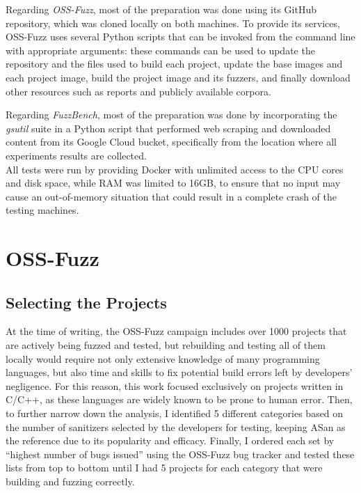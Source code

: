 Regarding \textit{OSS-Fuzz}, most of the preparation was done using its GitHub repository, which was cloned locally on both machines. To provide its services, OSS-Fuzz uses several Python scripts that can be invoked from the command line with appropriate arguments: these commands can be used to update the repository and the files used to build each project, update the base images and each project image, build the project image and its fuzzers, and finally download other resources such as reports and publicly available corpora. 

Regarding \textit{FuzzBench}, most of the preparation was done by incorporating the \textit{gsutil} suite in a Python script that performed web scraping and downloaded content from its Google Cloud bucket, specifically from the location where all experiments results are collected.
\ \\

All tests were run by providing Docker with unlimited access to the CPU cores and disk space, while RAM was limited to 16GB, to ensure that no input may cause an out-of-memory situation that could result in a complete crash of the testing machines. 


\newpage
\section{OSS-Fuzz}
\subsection{Selecting the Projects} \label{selection}
At the time of writing, the OSS-Fuzz campaign includes over 1000 projects that are actively being fuzzed and tested, but rebuilding and testing all of them locally would require not only extensive knowledge of many programming languages, but also time and skills to fix potential build errors left by developers' negligence. For this reason, this work focused exclusively on projects written in C/C++, as these languages are widely known to be prone to human error. Then, to further narrow down the analysis, I identified 5 different categories based on the number of sanitizers selected by the developers for testing, keeping ASan as the reference due to its popularity and efficacy. Finally, I ordered each set by ``highest number of bugs issued'' using the OSS-Fuzz bug tracker and tested these lists from top to bottom until I had 5 projects for each category that were building and fuzzing correctly.

